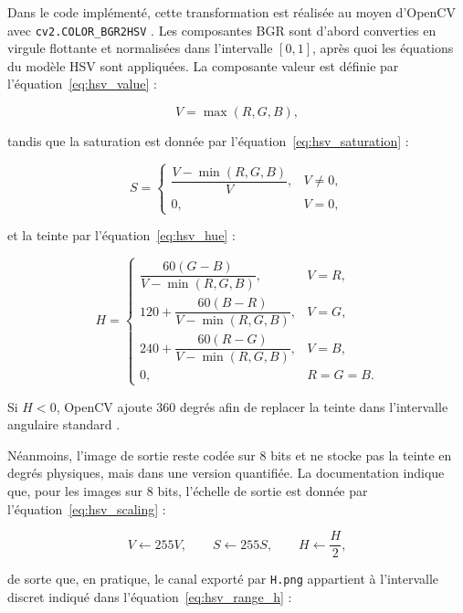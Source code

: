 Dans le code implémenté, cette transformation est réalisée au moyen d’OpenCV avec \texttt{cv2.COLOR\_BGR2HSV} \cite{opencv_color_conversions}. Les composantes BGR sont d’abord converties en virgule flottante et normalisées dans l’intervalle $[0,1]$, après quoi les équations du modèle HSV sont appliquées. La composante valeur est définie par l’équation~\eqref{eq:hsv_value} :

\begin{equation}
V=\max(R,G,B),
\label{eq:hsv_value}
\end{equation}

tandis que la saturation est donnée par l’équation~\eqref{eq:hsv_saturation} :

\begin{equation}
S=
\begin{cases}
\dfrac{V-\min(R,G,B)}{V}, & V\neq 0,\\[4pt]
0, & V=0,
\end{cases}
\label{eq:hsv_saturation}
\end{equation}

et la teinte par l’équation~\eqref{eq:hsv_hue} :

\begin{equation}
H=
\begin{cases}
\dfrac{60(G-B)}{V-\min(R,G,B)}, & V=R,\\[6pt]
120+\dfrac{60(B-R)}{V-\min(R,G,B)}, & V=G,\\[6pt]
240+\dfrac{60(R-G)}{V-\min(R,G,B)}, & V=B,\\[6pt]
0, & R=G=B.
\end{cases}
\label{eq:hsv_hue}
\end{equation}

Si $H<0$, OpenCV ajoute $360$ degrés afin de replacer la teinte dans l’intervalle angulaire standard \cite{opencv_color_conversions}.

Néanmoins, l’image de sortie reste codée sur 8 bits et ne stocke pas la teinte en degrés physiques, mais dans une version quantifiée. La documentation indique que, pour les images sur 8 bits, l’échelle de sortie est donnée par l’équation~\eqref{eq:hsv_scaling} :

\begin{equation}
V \leftarrow 255V,
\qquad
S \leftarrow 255S,
\qquad
H \leftarrow \frac{H}{2},
\label{eq:hsv_scaling}
\end{equation}

de sorte que, en pratique, le canal exporté par \texttt{H.png} appartient à l’intervalle discret indiqué dans l’équation~\eqref{eq:hsv_range_h} :

